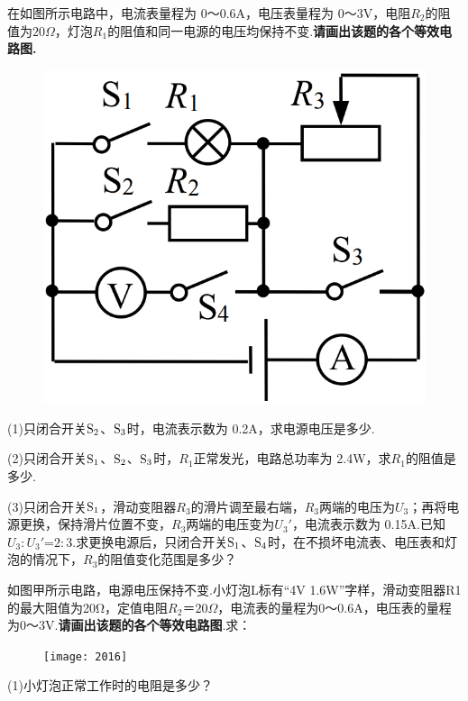 \documentclass[11pt,a4paper]{article}
\newcommand{\nianfen}[1]{\hspace{-2em}{(#1\textbf{·}\textit{青岛})}}
\begin{document}
	
	\nianfen{2017}在如图所示电路中，电流表量程为 0～0.6A，电压表量程为 0～3V，电阻$R_2$的阻值为$20Ω$，灯泡$R_1$的阻值和同一电源的电压均保持不变.\textbf{请画出该题的各个等效电路图.}
	\begin{figure}
		\includegraphics[width=\linewidth]{2017.bmp}
	\end{figure}
	
	(1)只闭合开关$\rm S_2$、$\rm S_3$时，电流表示数为 0.2A，求电源电压是多少.
	
	(2)只闭合开关$\rm S_1$、$\rm S_2$、$\rm S_3$时，$R_1$正常发光，电路总功率为 2.4W，求$R_1$的阻值是多少.
	
	(3)只闭合开关$\rm S_1$，滑动变阻器$R_3$的滑片调至最右端，$R_3$两端的电压为$U_3$；再将电源更换，保持滑片位置不变，$R_3$两端的电压变为$U_3'$，电流表示数为 0.15A.已知$U_3:U_3'$=$2:3$.求更换电源后，只闭合开关$\rm S_1$、$\rm S_4$时，在不损坏电流表、电压表和灯泡的情况下，$R_3$的阻值变化范围是多少？
	\clearpage
	
	\nianfen{2016}如图甲所示电路，电源电压保持不变.小灯泡L标有“4V 1.6W”字样，滑动变阻器R1的最大阻值为20Ω，定值电阻$ R_2＝20Ω $，电流表的量程为0～0.6A，电压表的量程为0～3V.\textbf{请画出该题的各个等效电路图}.求：
	
	\begin{figure}
		\texttt{[image: 2016]}
	\end{figure}
	
	(1)小灯泡正常工作时的电阻是多少？
	
\end{document}

